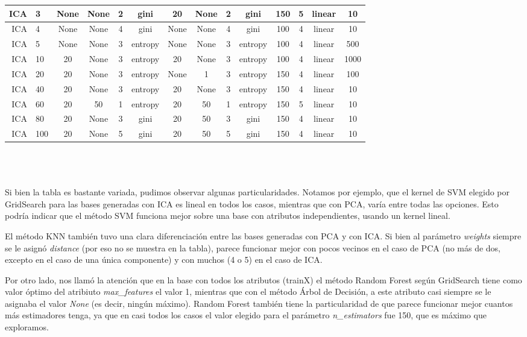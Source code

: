\documentclass[10pt, a4paper]{article}
\begin{document}
\begin{scriptsize}
\begin{tabular}{|r|l||c|c|c|c||c|c|c|c|c||c||c|c|}
\hline
ICA & 3 & None & None & 2 & gini & 20 & None & 2 & gini & 150 & 5 & linear & 10 \\
\hline
ICA & 4 & None & None & 4 & gini & None & None & 4 & gini & 100 & 4 & linear & 10 \\
\hline
ICA & 5 & None & None & 3 & entropy & None & None & 3 & entropy & 100 & 4 & linear & 500 \\
\hline
ICA & 10 & 20 & None & 3 & entropy & 20 & None & 3 & entropy & 100 & 4 & linear & 1000 \\
\hline
ICA & 20 & 20 & None & 3 & entropy & None & 1 & 3 & entropy & 150 & 4 & linear & 100 \\
\hline
ICA & 40 & 20 & None & 3 & entropy & 20 & None & 3 & entropy & 150 & 4 & linear & 10 \\
\hline
ICA & 60 & 20 & 50 & 1 & entropy & 20 & 50 & 1 & entropy & 150 & 5 & linear & 10 \\
\hline
ICA & 80 & 20 & None & 3 & gini & 20 & 50 & 3 & gini & 150 & 4 & linear & 10 \\
\hline
ICA & 100 & 20 & None & 5 & gini & 20 & 50 & 5 & gini & 150 & 4 & linear & 10 \\
\hline
\end{tabular}
\end{scriptsize}
\\\\\\
Si bien la tabla es bastante variada, pudimos observar algunas particularidades. Notamos por ejemplo, que el kernel de SVM elegido por GridSearch para las bases generadas con ICA es lineal en todos los casos, mientras que con PCA, varía entre todas las opciones. Esto podría indicar que el método SVM funciona mejor sobre una base con atributos independientes, usando un kernel lineal.

El método KNN también tuvo una clara diferenciación entre las bases generadas con PCA y con ICA. Si bien al parámetro \textit{weights} siempre se le asignó \textit{distance} (por eso no se muestra en la tabla), parece funcionar mejor con pocos vecinos en el caso de PCA (no más de dos, excepto en el caso de una única componente) y con muchos (4 o 5) en el caso de ICA.

Por otro lado, nos llamó la atención que en la base con todos los atributos (trainX) el método Random Forest según GridSearch tiene como valor óptimo del atribiuto \textit{max\_features} el valor 1, mientras que con el método Árbol de Decisión, a este atributo casi siempre se le asignaba el valor \textit{None} (es decir, ningún máximo). Random Forest también tiene la particularidad de que parece funcionar mejor cuantos más estimadores tenga, ya que en casi todos los casos el valor elegido para el parámetro \textit{n\_estimators} fue 150, que es máximo que exploramos.
\end{document}
